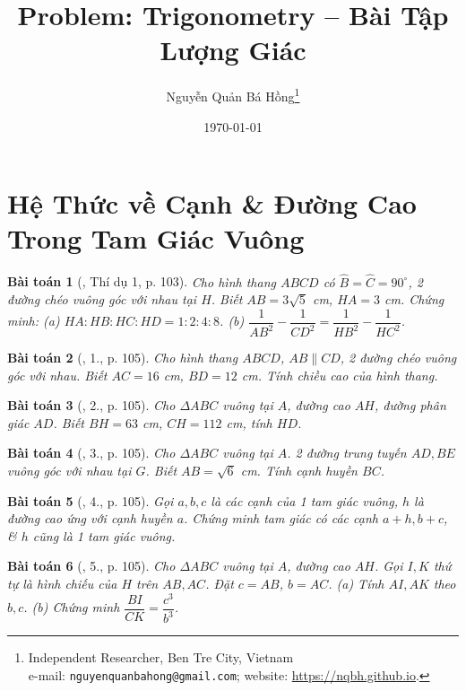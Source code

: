\documentclass{article}
\title{Problem: Trigonometry -- Bài Tập Lượng Giác}
\author{Nguyễn Quản Bá Hồng\footnote{Independent Researcher, Ben Tre City, Vietnam\\e-mail: \texttt{nguyenquanbahong@gmail.com}; website: \url{https://nqbh.github.io}.}}
\date{\today}
\newtheorem{baitoan}{Bài toán}
\begin{document}
\maketitle
\begin{abstract}
	
\end{abstract}
\tableofcontents


\section{Hệ Thức về Cạnh \& Đường Cao Trong Tam Giác Vuông}

\begin{baitoan}[\cite{Tuyen_Toan_9}, Thí dụ 1, p. 103]
	Cho hình thang $ABCD$ có $\widehat{B} = \widehat{C} = 90^\circ$, 2 đường chéo vuông góc với nhau tại $H$. Biết $AB = 3\sqrt{5}$ \emph{cm}, $HA = 3$ \emph{cm}. Chứng minh: (a) $HA:HB:HC:HD = 1:2:4:8$. (b) $\dfrac{1}{AB^2} - \dfrac{1}{CD^2} = \dfrac{1}{HB^2} - \dfrac{1}{HC^2}$.
\end{baitoan}

\begin{baitoan}[\cite{Tuyen_Toan_9}, 1., p. 105]
	Cho hình thang $ABCD$, $AB\parallel CD$, 2 đường chéo vuông góc với nhau. Biết $AC = 16$ \emph{cm}, $BD = 12$ \emph{cm}. Tính chiều cao của hình thang.
\end{baitoan}

\begin{baitoan}[\cite{Tuyen_Toan_9}, 2., p. 105]
	Cho $\Delta ABC$ vuông tại $A$, đường cao $AH$, đường phân giác $AD$. Biết $BH = 63$ \emph{cm}, $CH = 112$ \emph{cm}, tính $HD$.
\end{baitoan}

\begin{baitoan}[\cite{Tuyen_Toan_9}, 3., p. 105]
	Cho $\Delta ABC$ vuông tại $A$. 2 đường trung tuyến $AD,BE$ vuông góc với nhau tại $G$. Biết $AB = \sqrt{6}$ \emph{cm}. Tính cạnh huyền $BC$.
\end{baitoan}

\begin{baitoan}[\cite{Tuyen_Toan_9}, 4., p. 105]
	Gọi $a,b,c$ là các cạnh của 1 tam giác vuông, $h$ là đường cao ứng với cạnh huyền $a$. Chứng minh tam giác có các cạnh $a + h,b + c$, \& $h$ cũng là 1 tam giác vuông.
\end{baitoan}

\begin{baitoan}[\cite{Tuyen_Toan_9}, 5., p. 105]
	Cho $\Delta ABC$ vuông tại $A$, đường cao $AH$. Gọi $I,K$ thứ tự là hình chiếu của $H$ trên $AB,AC$. Đặt $c = AB$, $b = AC$. (a) Tính $AI,AK$ theo $b,c$. (b) Chứng minh $\dfrac{BI}{CK} = \dfrac{c^3}{b^3}$.
\end{baitoan}
\end{document}
